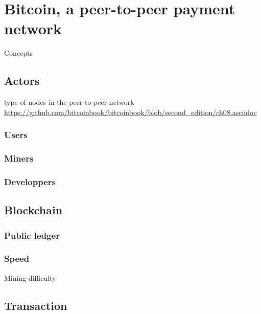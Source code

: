 \chapter{Bitcoin, a peer-to-peer payment network}
\label{chap:bitcoin}

Concepts
\lipsum[1-2]

\minitoc

\newpage

\section{Actors}

\lipsum[1-2]

type of nodes in the peer-to-peer network
\url{https://github.com/bitcoinbook/bitcoinbook/blob/second_edition/ch08.asciidoc}

\subsection{Users}
\subsection{Miners}
\subsection{Developpers}


\section{Blockchain}

\lipsum[1-2]

\subsection{Public ledger}
\subsection{Speed}
Mining difficulty

\section{Transaction}

